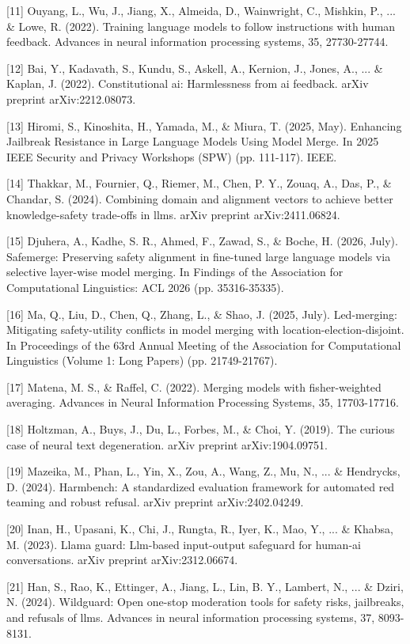 \documentclass{article}
\begin{document}
{[11] Ouyang, L., Wu, J., Jiang, X., Almeida, D., Wainwright, C., Mishkin, P., ... \& Lowe, R. (2022). Training language models to follow instructions with human feedback. Advances in neural information processing systems, 35, 27730-27744.

[12] Bai, Y., Kadavath, S., Kundu, S., Askell, A., Kernion, J., Jones, A., ... \& Kaplan, J. (2022). Constitutional ai: Harmlessness from ai feedback. arXiv preprint arXiv:2212.08073.

[13] Hiromi, S., Kinoshita, H., Yamada, M., \& Miura, T. (2025, May). Enhancing Jailbreak Resistance in Large Language Models Using Model Merge. In 2025 IEEE Security and Privacy Workshops (SPW) (pp. 111-117). IEEE.

[14] Thakkar, M., Fournier, Q., Riemer, M., Chen, P. Y., Zouaq, A., Das, P., \& Chandar, S. (2024). Combining domain and alignment vectors to achieve better knowledge-safety trade-offs in llms. arXiv preprint arXiv:2411.06824.

[15] Djuhera, A., Kadhe, S. R., Ahmed, F., Zawad, S., \& Boche, H. (2026, July). Safemerge: Preserving safety alignment in fine-tuned large language models via selective layer-wise model merging. In Findings of the Association for Computational Linguistics: ACL 2026 (pp. 35316-35335).

[16] Ma, Q., Liu, D., Chen, Q., Zhang, L., \& Shao, J. (2025, July). Led-merging: Mitigating safety-utility conflicts in model merging with location-election-disjoint. In Proceedings of the 63rd Annual Meeting of the Association for Computational Linguistics (Volume 1: Long Papers) (pp. 21749-21767).

[17] Matena, M. S., \& Raffel, C. (2022). Merging models with fisher-weighted averaging. Advances in Neural Information Processing Systems, 35, 17703-17716.

[18] Holtzman, A., Buys, J., Du, L., Forbes, M., \& Choi, Y. (2019). The curious case of neural text degeneration. arXiv preprint arXiv:1904.09751.

[19] Mazeika, M., Phan, L., Yin, X., Zou, A., Wang, Z., Mu, N., ... \& Hendrycks, D. (2024). Harmbench: A standardized evaluation framework for automated red teaming and robust refusal. arXiv preprint arXiv:2402.04249.

[20] Inan, H., Upasani, K., Chi, J., Rungta, R., Iyer, K., Mao, Y., ... \& Khabsa, M. (2023). Llama guard: Llm-based input-output safeguard for human-ai conversations. arXiv preprint arXiv:2312.06674.

[21] Han, S., Rao, K., Ettinger, A., Jiang, L., Lin, B. Y., Lambert, N., ... \& Dziri, N. (2024). Wildguard: Open one-stop moderation tools for safety risks, jailbreaks, and refusals of llms. Advances in neural information processing systems, 37, 8093-8131.

}
\end{document}
